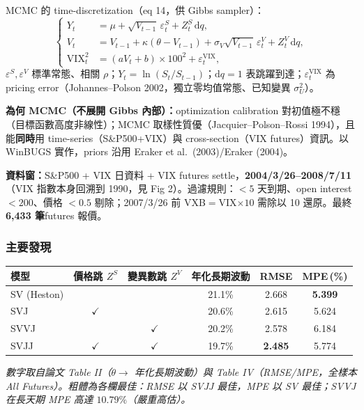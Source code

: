\documentclass[12pt, a4paper]{article}
\theoremstyle{remark}
\newcommand{\VIX}{\mathrm{VIX}}
\begin{document}
MCMC 的 time-discretization（eq 14，供 Gibbs sampler）：
\begin{equation}
  \left\{
  \begin{aligned}
    Y_t &= \mu + \sqrt{V_{t-1}}\,\varepsilon_t^S + Z_t^S\,\mathrm{d}q,\\
    V_t &= V_{t-1} + \kappa(\theta-V_{t-1}) + \sigma_V\sqrt{V_{t-1}}\,\varepsilon_t^V + Z_t^V\,\mathrm{d}q,\\
    \VIX_t^2 &= (aV_t+b)\times100^2 + \varepsilon_t^{\VIX},
  \end{aligned}
  \right.
  \tag{14}
\end{equation}
$\varepsilon^S,\varepsilon^V$ 標準常態、相關 $\rho$；$Y_t=\ln(S_t/S_{t-1})$；$\mathrm{d}q=1$ 表跳躍到達；$\varepsilon_t^{\VIX}$ 為 pricing error（Johannes--Polson 2002，獨立零均值常態、已知變異 $\sigma_U^2$）。

\textbf{為何 MCMC（不展開 Gibbs 內部）：}optimization calibration 對初值極不穩（目標函數高度非線性）；MCMC 取樣性質優（Jacquier--Polson--Rossi 1994），且能\textbf{同時}用 time-series（S\&P500+VIX）與 cross-section（VIX futures）資訊。以 WinBUGS 實作，priors 沿用 Eraker et al.\ (2003)/Eraker (2004)。

\textbf{資料窗：}S\&P500 + VIX 日資料 + VIX futures settle，\textbf{2004/3/26--2008/7/11}（VIX 指數本身回溯到 1990，見 Fig 2）。過濾規則：$<5$ 天到期、open interest $<200$、價格 $<0.5$ 剔除；2007/3/26 前 VXB$=$VIX$\times10$ 需除以 10 還原。最終 \textbf{6{,}433 筆}futures 報價。

\subsubsection*{主要發現}

\begin{center}
\small
\begin{tabular}{lccccc}
\toprule
模型 & 價格跳 $Z^S$ & 變異數跳 $Z^V$ & 年化長期波動 & RMSE & MPE\,(\%) \\
\midrule
SV (Heston) &              &              & 21.1\% & 2.668          & \textbf{5.399} \\
SVJ         & $\checkmark$ &              & 20.6\% & 2.615          & 5.624 \\
SVVJ        &              & $\checkmark$ & 20.2\% & 2.578          & 6.184 \\
SVJJ        & $\checkmark$ & $\checkmark$ & 19.7\% & \textbf{2.485} & 5.774 \\
\bottomrule
\end{tabular}
\end{center}
{\small\textit{數字取自論文 Table II（$\theta\to$ 年化長期波動）與 Table IV（RMSE/MPE，全樣本 All Futures）。粗體為各欄最佳：RMSE 以 SVJJ 最佳，MPE 以 SV 最佳；SVVJ 在長天期 MPE 高達 $10.79\%$（嚴重高估）。}}
\end{document}
